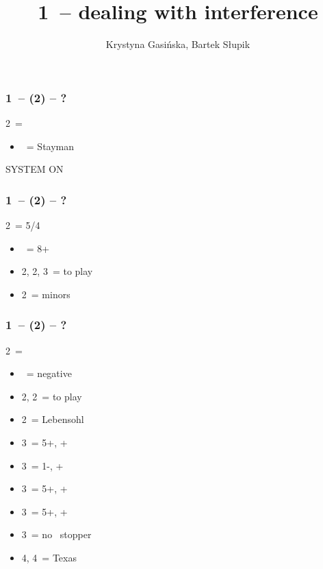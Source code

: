 \documentclass[12pt, a4paper]{article}
\title{1\ntx\ -- dealing with interference}
\author{Krystyna Gasińska, Bartek Słupik}
\begin{document}
\maketitle


\subsubsection*{1\ntx\ -- (2\clubs) -- ?}
2\clubs\ = \clubs
\begin{itemize}
    \item \dbl\ = Stayman
\end{itemize}

SYSTEM ON

\subsubsection*{1\ntx\ -- (2\clubs\alrts) -- ?}
2\clubs\ = 5/4 \major
\begin{itemize}
    \item \dbl\ = 8+
    \item 2\hearts, 2\spades, 3\clubs\ = to play
    \item 2\nt\ = minors
\end{itemize}

\subsubsection*{1\ntx\ -- (2\diams) -- ?}
2\diams\ = \diams
\begin{itemize}
    \item \dbl\ = negative
    \item 2\hearts, 2\spades\ = to play
    \item 2\nt\ = Lebensohl
    \item 3\clubs\ = 5+\hearts, \inv+
    \item 3\diams\ = 1-\diams, \inv+
    \item 3\hearts\ = 5+\spades, \inv+
    \item 3\spades\ = 5+\clubs, \inv+
    \item 3\nt\ = no \diams\ stopper
    \item 4\diams, 4\hearts\ = Texas
\end{itemize}
\end{document}
